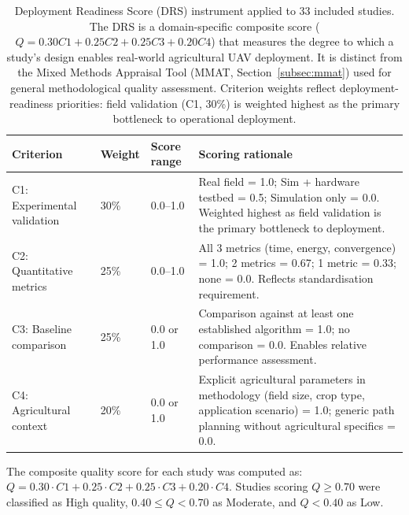\documentclass[review,3p,times]{elsarticle}
\begin{document}
\begin{table}[htbp]
\centering
\caption{Deployment Readiness Score (DRS) instrument applied to 33 included studies. The DRS is a domain-specific composite score ($Q = 0.30 C1 + 0.25 C2 + 0.25 C3 + 0.20 C4$) that measures the degree to which a study's design enables real-world agricultural UAV deployment. It is distinct from the Mixed Methods Appraisal Tool (MMAT, Section~\ref{subsec:mmat}) used for general methodological quality assessment. Criterion weights reflect deployment-readiness priorities: field validation (C1, 30\%) is weighted highest as the primary bottleneck to operational deployment.}
\label{tab:quality_criteria}
\begin{tabularx}{\textwidth}{lllX}
\toprule
\textbf{Criterion} & \textbf{Weight} & \textbf{Score range} & \textbf{Scoring rationale} \\
\midrule
C1: Experimental validation & 30\% & 0.0--1.0 & Real field = 1.0; Sim + hardware testbed = 0.5; Simulation only = 0.0. Weighted highest as field validation is the primary bottleneck to deployment. \\
C2: Quantitative metrics & 25\% & 0.0--1.0 & All 3 metrics (time, energy, convergence) = 1.0; 2 metrics = 0.67; 1 metric = 0.33; none = 0.0. Reflects standardisation requirement. \\
C3: Baseline comparison & 25\% & 0.0 or 1.0 & Comparison against at least one established algorithm = 1.0; no comparison = 0.0. Enables relative performance assessment. \\
C4: Agricultural context & 20\% & 0.0 or 1.0 & Explicit agricultural parameters in methodology (field size, crop type, application scenario) = 1.0; generic path planning without agricultural specifics = 0.0. \\
\bottomrule
\end{tabularx}
\end{table}

The composite quality score for each study was computed as: $Q = 0.30 \cdot C1 + 0.25 \cdot C2 + 0.25 \cdot C3 + 0.20 \cdot C4$. Studies scoring $Q \geq 0.70$ were classified as High quality, $0.40 \leq Q < 0.70$ as Moderate, and $Q < 0.40$ as Low.
\end{document}
